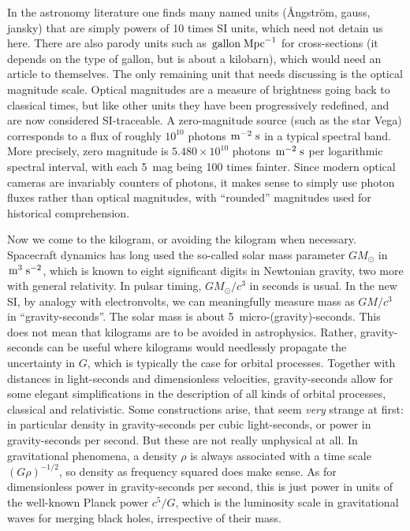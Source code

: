 \documentclass[aps,prb,12pt]{revtex4-1}
\def\unit#1{\;{\rm#1}}
\begin{document}
In the astronomy literature one finds many named units (\AA ngström,
gauss, jansky) that are simply powers of 10 times SI units, which need
not detain us here.  There are also parody units such as
$\!\unit{gallon}\unit{Mpc}^{-1}$ for cross-sections (it depends on the
type of gallon, but is about a kilobarn), which would need an article
to themselves.  The only remaining unit that needs discussing is the
optical magnitude scale.  Optical magnitudes are a measure of
brightness going back to classical times, but like other units they
have been progressively redefined, and are now considered
SI-traceable.  A zero-magnitude source (such as the star Vega)
corresponds to a flux of roughly $10^{10}$ photons
$\!\unit{m}^{-2}\unit{s}$ in a typical spectral band.  More precisely,
zero magnitude is $5.480 \times10^{10}$ photons
$\!\unit{m}^{-2}\unit{s}$ per logarithmic spectral interval, with each
5~mag being 100 times fainter.  Since modern optical cameras are
invariably counters of photons, it makes sense to simply use photon
fluxes rather than optical magnitudes, with ``rounded'' magnitudes
used for historical comprehension.

Now we come to the kilogram, or avoiding the kilogram when necessary.
Spacecraft dynamics has long used the so-called solar mass parameter
$GM_\odot$ in $\!\unit{m}^3\unit{s}^{-2}$, which is known to eight
significant digits in Newtonian gravity, two more with general
relativity.  In pulsar timing, $GM_\odot/c^3$ in seconds is usual.  In
the new SI, by analogy with electronvolts, we can meaningfully measure
mass as $GM/c^3$ in ``gravity-seconds''.  The solar mass is about
5~micro-(gravity)-seconds.  This does not mean that kilograms are to
be avoided in astrophysics.  Rather, gravity-seconds can be useful
where kilograms would needlessly propagate the uncertainty in $G$,
which is typically the case for orbital processes.  Together with
distances in light-seconds and dimensionless velocities,
gravity-seconds allow for some elegant simplifications in the
description of all kinds of orbital processes, classical and
relativistic.\cite{2020PASP..132b1001S} Some constructions arise, that
seem {\em very} strange at first: in particular density in
gravity-seconds per cubic light-seconds, or power in gravity-seconds
per second.  But these are not really unphysical at all.  In
gravitational phenomena, a density $\rho$ is always associated with a
time scale $(G\rho)^{-1/2}$, so density as frequency squared does make
sense.  As for dimensionless power in gravity-seconds per second, this
is just power in units of the well-known Planck power $c^5/G$, which
is the luminosity scale in gravitational waves for merging black
holes, irrespective of their mass.
\end{document}
